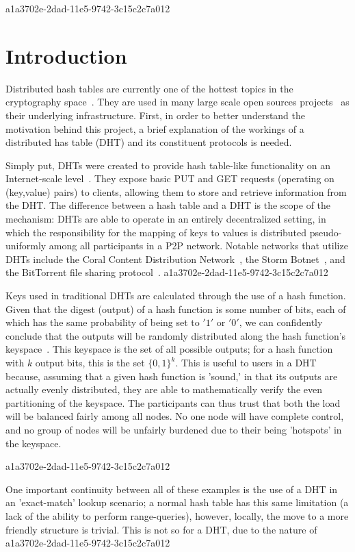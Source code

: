 \documentclass[12pt]{article}
\begin{document}
a1a3702e-2dad-11e5-9742-3c15c2c7a012\section{Introduction}
\par Distributed hash tables are currently one of the hottest topics in the cryptography space~\cite{Stoica:2001dj,Rowstron:2001ea,Ratnasamy:2001wn}. They are used in many large scale open sources projects~\cite{Freitas:2013tb,Xu:2010vs,Perfitt:2010fh} as their underlying infrastructure. First, in order to better understand the motivation behind this project, a brief explanation of the workings of a distributed has table (DHT) and its constituent protocols is needed.

\par Simply put, DHTs were created to provide hash table-like functionality on an Internet-scale level~\cite{Ratnasamy:2001wn}. They expose basic PUT and GET requests (operating on (key,value) pairs) to clients, allowing them to store and retrieve information from the DHT. The difference between a hash table and a DHT is the scope of the mechanism: DHTs are able to operate in an entirely decentralized setting, in which the responsibility for the mapping of keys to values is distributed pseudo-uniformly among all participants in a P2P network. Notable networks that utilize DHTs include the Coral Content Distribution Network~\cite{Freedman:2004vb}, the Storm Botnet~\cite{Holz:2008uk}, and the BitTorrent file sharing protocol~\cite{Cohen:y1_8mBnw}.
a1a3702e-2dad-11e5-9742-3c15c2c7a012
\par Keys used in traditional DHTs are calculated through the use of a hash function. Given that the digest (output) of a hash function is some number of bits, each of which has the same probability of being set to $'1'$ or $'0'$, we can confidently conclude that the outputs will be randomly distributed along the hash function's keyspace~. This keyspace is the set of all possible outputs; for a hash function with $k$ output bits, this is the set $\{0,1\}^k$. This is useful to users in a DHT because, assuming that a given hash function is 'sound,' in that its outputs are actually evenly distributed, they are able to mathematically verify the even partitioning of the keyspace. The participants can thus trust that both the load will be balanced fairly among all nodes. No one node will have complete control, and no group of nodes will be unfairly burdened due to their being 'hotspots' in the keyspace.~

a1a3702e-2dad-11e5-9742-3c15c2c7a012\par One important continuity between all of these examples is the use of a DHT in an 'exact-match' lookup scenario; a normal hash table has this same limitation (a lack of the ability to perform range-queries), however, locally, the move to a more friendly structure is trivial. This is not so for a DHT, due to the nature of
a1a3702e-2dad-11e5-9742-3c15c2c7a012\printbibliography
\end{document}
